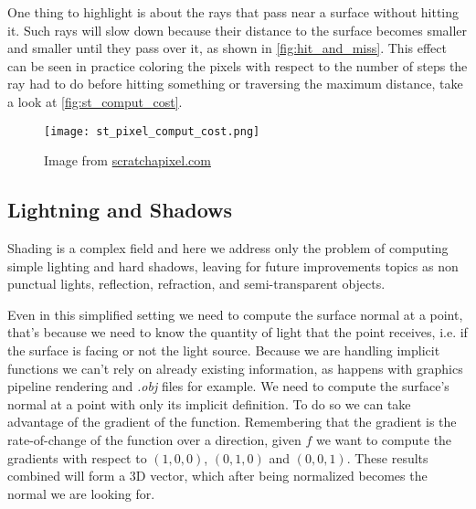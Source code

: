 One thing to highlight is about the rays that pass near a surface without hitting it.
Such rays will slow down because their distance to the surface becomes smaller and smaller until they pass over it, as shown in \autoref{fig:hit_and_miss}.
This effect can be seen in practice coloring the pixels with respect to the number of steps the ray had to do before hitting something or traversing the maximum distance, take a look at \autoref{fig:st_comput_cost}.
\begin{figure}[!htb]
  \centering
  \texttt{[image: st\_pixel\_comput\_cost.png]}
  \caption{Image from \url{scratchapixel.com}}
  \label{fig:st_comput_cost}
\end{figure}






\subsection{Lightning and Shadows}



Shading is a complex field and here we address only the problem of computing simple lighting and hard shadows, leaving for future improvements topics as non punctual lights, reflection, refraction, and semi-transparent objects.

Even in this simplified setting we need to compute the surface normal at a point, 
that's because we need to know the quantity of light that the point receives, i.e. if the surface is facing or not the light source.
Because we are handling implicit functions we can't rely on already existing information, as happens with graphics pipeline rendering and \emph{.obj} files for example.
We need to compute the surface's normal at a point with only its implicit definition.
To do so we can take advantage of the gradient of the function.
Remembering that the gradient is the rate-of-change of the function over a direction, given $f$ we want to compute the gradients with respect to $(1,0,0)$, $(0,1,0)$ and $(0,0,1)$.
These results combined will form a 3D vector, which after being normalized becomes the normal we are looking for.

